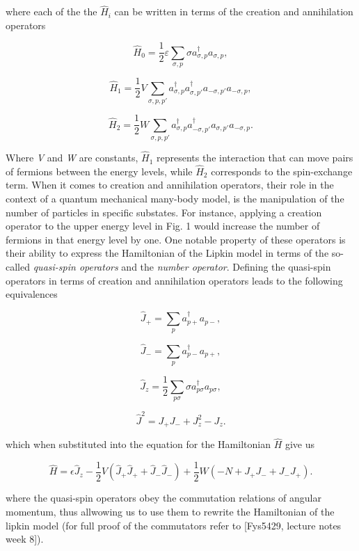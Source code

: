 \documentclass[onecolumn,10pt,cleanfoot]{asme2ej}
\begin{document}
where each of the the $\hat{H}_{i}$ can be written in terms of the creation and annihilation operators

\begin{equation}
\hat{H}_0 = \frac{1}{2}\varepsilon\sum_{\sigma,p}\sigma a_{\sigma,p}^{\dagger}a_{\sigma,p},
\end{equation}

\begin{equation}
\hat{H}_1 = \frac{1}{2}V\sum_{\sigma,p,p'} a_{\sigma,p}^{\dagger}a_{\sigma,p'}^{\dagger}a_{-\sigma,p'}a_{-\sigma,p},
\end{equation}

\begin{equation}
\hat{H}_2 = \frac{1}{2}W\sum_{\sigma,p,p'} a_{\sigma,p}^{\dagger}a_{-\sigma,p'}^{\dagger}a_{\sigma,p'}a_{-\sigma,p}.
\end{equation}

Where \textit{V} and \textit{W} are constants, $\hat{H}_1$ represents the interaction that can move pairs of fermions between the energy levels, while $\hat{H}_2$ corresponds to the spin-exchange term. When it comes to creation and annihilation operators, their role in the context of a quantum mechanical many-body model, is the manipulation of the number of particles in specific substates. For instance, applying a creation operator to the upper energy level in Fig. 1 would increase the number of fermions in that energy level by one. One notable property of these operators is their ability to express the Hamiltonian of the Lipkin model in terms of the so-called \textit{quasi-spin operators} and the \textit{number operator}. Defining the quasi-spin operators in terms of creation and annihilation operators leads to the following equivalences 

\begin{equation}
\hat{J}_{+} = \sum_{p} a_{p+}^{\dagger}a_{p-},
\end{equation}

\begin{equation}
\hat{J}_{-} = \sum_{p} a_{p-}^{\dagger}a_{p+},
\end{equation}

\begin{equation}
\hat{J}_{z} = \frac{1}{2}\sum_{p\sigma} \sigma a_{p\sigma}^{\dagger}a_{p\sigma}, 
\end{equation}

\begin{equation}
\hat{J}^{2} = J_{+}J_{-} + J_{z}^{2} - J_{z}.
\end{equation}

which when substituted into the equation for the Hamiltonian $\hat{H}$ give us

\begin{equation}
\hat{H} = \epsilon\hat{J}_z - \frac{1}{2}V(\hat{J}_+\hat{J}_+ + \hat{J}_-\hat{J}_-) + \frac{1}{2}W\left( -N + J_+ J_- + J_- J_+ \right).
\end{equation}

where the quasi-spin operators obey the commutation relations of angular momentum, thus allwowing us to use them to rewrite the Hamiltonian of the lipkin model (for full proof of the commutators refer to [Fys5429, lecture notes week 8]). 
\end{document}
